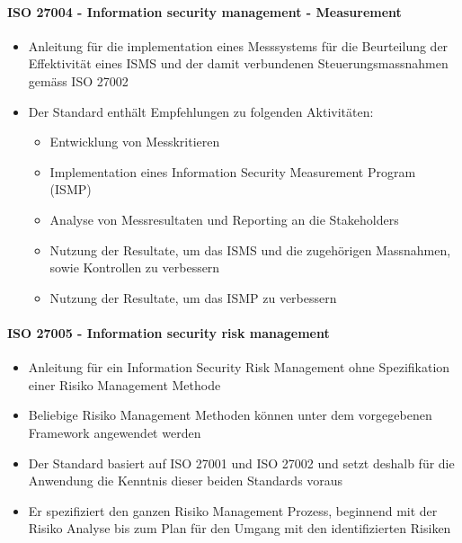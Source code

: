 \documentclass[10pt,a4paper]{article}
\begin{document}
\paragraph*{ISO 27004 - Information security management - Measurement}\label{para:ISO 27004}
\begin{itemize}[noitemsep,topsep=0pt,leftmargin=*]
    \item Anleitung für die implementation eines Messsystems für die Beurteilung der Effektivität eines ISMS und der damit verbundenen Steuerungsmassnahmen gemäss ISO 27002
    \item Der Standard enthält Empfehlungen zu folgenden Aktivitäten:
    \begin{itemize}[noitemsep,topsep=0pt,leftmargin=*]
        \item Entwicklung von Messkritieren
        \item Implementation eines Information Security Measurement Program (ISMP)
        \item Analyse von Messresultaten und Reporting an die Stakeholders
        \item Nutzung der Resultate, um das ISMS und die zugehörigen Massnahmen, sowie Kontrollen zu verbessern
        \item Nutzung der Resultate, um das ISMP zu verbessern
    \end{itemize}
\end{itemize}

\paragraph*{ISO 27005 - Information security risk management}\label{para:ISO 27005}
\begin{itemize}[noitemsep,topsep=0pt,leftmargin=*]
    \item Anleitung für ein Information Security Risk Management ohne Spezifikation einer Risiko Management Methode
    \item Beliebige Risiko Management Methoden können unter dem vorgegebenen Framework angewendet werden
    \item Der Standard basiert auf ISO 27001 und ISO 27002 und setzt deshalb für die Anwendung die Kenntnis dieser beiden Standards voraus
    \item Er spezifiziert den ganzen Risiko Management Prozess, beginnend mit der Risiko Analyse bis zum Plan für den Umgang mit den identifizierten Risiken
\end{itemize}
\end{document}
